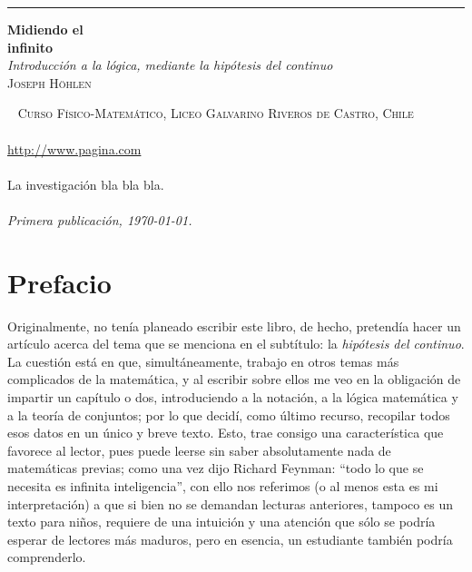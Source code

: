 \documentclass[11pt,a4paper]{book}
\begin{document}


\frontmatter
\begin{titlepage}
	\raggedleft
	\rule{1pt}{\textheight}
	\hspace{0.05\textwidth}
	\parbox[b]{0.75\textwidth}{
		{\Huge\bfseries Midiendo el\\[0.5\baselineskip]infinito}\\[2\baselineskip] %
		{\large\textit{Introducción a la lógica, mediante la hipótesis del continuo}}\\[4\baselineskip] %
		{\Large\textsc{Joseph Höhlen}\\[0.5\baselineskip]} %
		\vspace{0.5\textheight}
	}
\end{titlepage}

\newpage
~\vfill
\thispagestyle{empty}
\noindent \textsc{Curso Físico-Matemático, Liceo Galvarino Riveros de Castro, Chile}\\\\
\url{http://www.pagina.com}\\ \\
La investigación bla bla bla.\\ \\
\textit{Primera publicación, \today{}.} 

\tableofcontents

\chapter{Prefacio}
Originalmente, no tenía planeado escribir este libro, de hecho, pretendía hacer un artículo acerca del tema que se menciona en el subtítulo: la \textit{hipótesis del continuo}. La cuestión está en que, simultáneamente, trabajo en otros temas más complicados de la matemática, y al escribir sobre ellos me veo en la obligación de impartir un capítulo o dos, introduciendo a la notación, a la lógica matemática y a la teoría de conjuntos; por lo que decidí, como último recurso, recopilar todos esos datos en un único y breve texto. Esto, trae consigo una característica que favorece al lector, pues puede leerse sin saber absolutamente nada de matemáticas previas; como una vez dijo Richard Feynman: ``todo lo que se necesita es infinita inteligencia'', con ello nos referimos (o al menos esta es mi interpretación) a que si bien no se demandan lecturas anteriores, tampoco es un texto para niños, requiere de una intuición y una atención que sólo se podría esperar de lectores más maduros, pero en esencia, un estudiante también podría comprenderlo.
\end{document}

